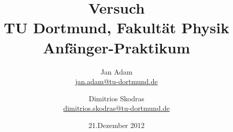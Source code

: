 



\title{Versuch\\				%
\large TU Dortmund, Fakultät Physik\\ 
\normalsize Anfänger-Praktikum}

\author{Jan Adam\\			%
{\small \href{jan.adam@tu-dortmund.de}{jan.adam@tu-dortmund.de}}	%
\and						%
Dimitrios Skodras\\					%
{\small \href{dimitrios.skodras@tu-dortmund.de}{dimitrios.skodras@tu-dortmund.de}}		%
}
\date{21.Dezember 2012}				%





\maketitle					%
\thispagestyle{empty} 				%



\tableofcontents


\newpage					%




